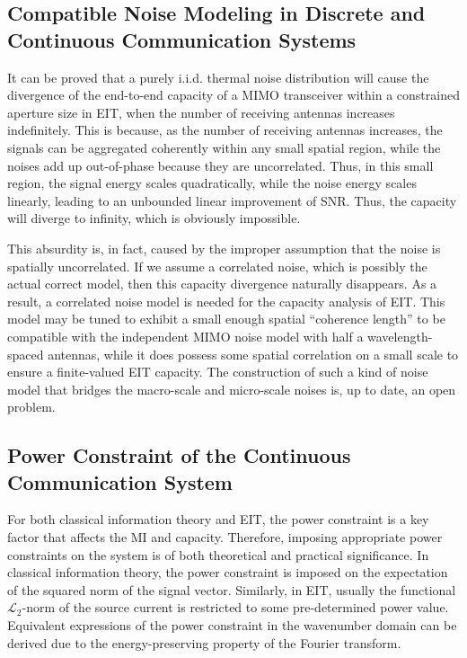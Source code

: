 \documentclass[journal,twocolumn]{IEEEtran}
\begin{document}
\subsection{Compatible Noise Modeling in Discrete and Continuous Communication Systems}
It can be proved that a purely i.i.d. thermal noise distribution will cause the divergence of the end-to-end capacity of a MIMO transceiver within a constrained aperture size in EIT, when the number of receiving antennas increases indefinitely. 
This is because, as the number of receiving antennas increases, the signals can be aggregated coherently within any small spatial region, while the noises add up out-of-phase because they are uncorrelated. 
Thus, in this small region, the signal energy scales quadratically, while the noise energy scales linearly, leading to an unbounded linear improvement of SNR. Thus, the capacity will diverge to infinity, which is obviously impossible.  

This absurdity is, in fact, caused by the improper assumption that the noise is spatially uncorrelated. 
If we assume a correlated noise, which is possibly the actual correct model, then this capacity divergence naturally disappears. 
As a result, a correlated noise model is needed for the capacity analysis of EIT. This model may be tuned to exhibit a small enough spatial ``coherence length'' to be compatible with the independent MIMO noise model with half a wavelength-spaced antennas, while it does possess some spatial correlation on a small scale to ensure a finite-valued EIT capacity. 
The construction of such a kind of noise model that bridges the macro-scale and micro-scale noises is, up to date, an open problem. 

\subsection{Power Constraint of the Continuous Communication System}
For both classical information theory and EIT, the power constraint is a key factor that affects the MI and capacity. 
Therefore, imposing appropriate power constraints on the system is of both theoretical and practical significance. 
In classical information theory, the power constraint is imposed on the expectation of the squared norm of the signal vector.  
Similarly, in EIT, usually the functional $\mathcal{L}_2$-norm of the source current is restricted to some pre-determined power value. 
Equivalent expressions of the power constraint in the wavenumber domain can be derived due to the energy-preserving property of the Fourier transform. 
\end{document}
